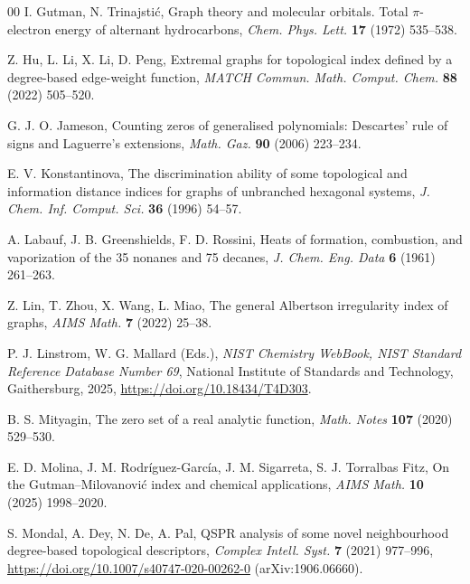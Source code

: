 \documentclass[a5paper, 10pt]{article}
\theoremstyle{plain}
\theoremstyle{remark}
\theoremstyle{definition}
\begin{document}
\begin{thebibliography}{00}
   I. Gutman, N. Trinajsti\'c, Graph theory
  and molecular orbitals. Total $\pi$-electron energy of alternant
  hydrocarbons, \textit{Chem. Phys. Lett.\/} \textbf{17} (1972) 535--538.

   Z. Hu, L. Li, X. Li, D. Peng, Extremal graphs
  for topological index defined by a degree-based edge-weight
  function, \textit{MATCH Commun. Math. Comput. Chem.\/} \textbf{88}
  (2022) 505--520.

   G. J. O. Jameson, Counting zeros of generalised
  polynomials: Descartes' rule of signs and Laguerre's extensions,
  \textit{Math. Gaz.\/} \textbf{90} (2006) 223--234.

   E. V. Konstantinova, The
  discrimination ability of some topological and information distance indices
  for graphs of unbranched hexagonal systems, \textit{J. Chem. Inf. Comput.
  Sci.\/} \textbf{36} (1996) 54--57.

   A. Labauf, J. B. Greenshields,
  F. D. Rossini, Heats of formation, combustion, and vaporization of the
  35 nonanes and 75 decanes, \textit{J. Chem. Eng. Data\/} \textbf{6}
  (1961) 261--263.

   Z. Lin, T. Zhou, X. Wang, L. Miao, The general
  Albertson irregularity index of graphs, \textit{AIMS Math.\/} \textbf{7}
  (2022) 25--38.

   P. J. Linstrom, W. G. Mallard (Eds.), \textit{NIST
  Chemistry WebBook, NIST Standard Reference Database Number 69\/}, National
  Institute of Standards and Technology, Gaithersburg, 2025,
  \url{https://doi.org/10.18434/T4D303}.

   B. S. Mityagin, The zero set of a real analytic
  function, \textit{Math. Notes\/} \textbf{107} (2020) 529--530.

   E. D. Molina, J. M.
  Rodr\'iguez-Garc\'ia, J. M. Sigarreta, S. J. Torralbas Fitz, On the
  Gutman--Milovanovi\'c index and chemical applications, \textit{AIMS
  Math.\/} \textbf{10} (2025) 1998--2020.

  S. Mondal, A. Dey, N. De, A. Pal, QSPR analysis of some novel
  neighbourhood degree-based topological descriptors, \textit{Complex
  Intell. Syst.\/} \textbf{7} (2021) 977--996,
  \url{https://doi.org/10.1007/s40747-020-00262-0} (arXiv:1906.06660).


\end{thebibliography}
\end{document}
